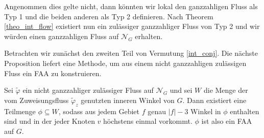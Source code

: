 Angenommen dies gelte nicht, dann könnten wir lokal den ganzzahligen Fluss als Typ 1 und die beiden anderen als Typ 2 definieren. Nach Theorem \ref{theo_int_flow} existiert nun ein zulässiger ganzzahliger Fluss von Typ 2 und wir würden einen ganzzahligen Fluss auf $\mathcal{N}_G$ erhalten. 

Betrachten wir zunächst den zweiten Teil von Vermutung \ref{int_conj}. Die nächste Proposition liefert eine Methode, um aus einem nicht ganzzahligen zulässigen Fluss ein FAA zu konstruieren.

\begin{proposition}\label{lem_faa}
Sei $\tilde{\varphi}$ ein nicht ganzzahliger zulässiger Fluss auf $\mathcal{N}_G$ und sei $W$ die Menge der vom Zuweisungsfluss $\tilde{\varphi}_z$ genutzten inneren Winkel von $G$. Dann existiert eine Teilmenge $\phi\subseteq W$, sodass aus jedem Gebiet $f$ genau $|f|-3$ Winkel in $\phi$ enthalten sind und in der jeder Knoten $v$ höchstens einmal vorkommt. $\phi$ ist also ein FAA auf $G$.
\end{proposition}

